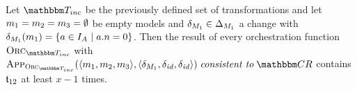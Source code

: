 \begin{lemma}
    \label{lemma:minimal_executions}
    Let $\transformationset{T}_{inc}$ be the previously defined set of transformations and let $m_{1} = m_{2} = m_{3} = \emptyset$ be empty models and $\delta_{M_{1}} \in \Delta_{M_{1}}$ a change with $\delta_{M_{1}}(m_{1}) = \{ a \in I_{A_{}} \mid a.n = 0 \}$.
    Then the result of every orchestration function $\orcfunction{\transformationset{T}_{inc}}$ with $\appfunction{\orcfunction{\transformationset{T}_{inc}}}(\tupled{\model{m}{1},\model{m}{2},\model{m}{3}},\tupled{\change{\metamodel{M}{1}},\identitychange,\identitychange}) \consistenttomath \consistencyrelationset{CR}$ contains $\mathfrak{t}_{12}$ at least $x-1$ times.
\end{lemma}
